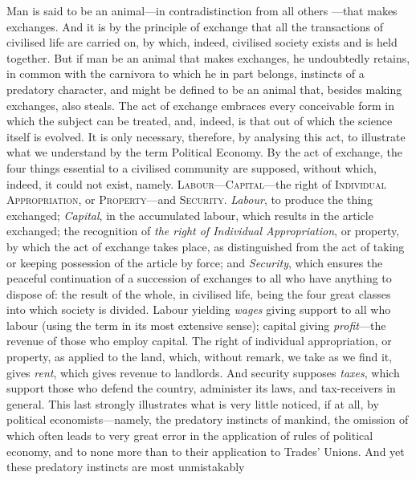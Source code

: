 \documentclass[12pt, a4paper]{book}
\begin{document}
    Man is said to be an animal---in contradistinction from all others
   ---that makes exchanges. And it is by the principle of exchange
    that all the transactions of civilised life are carried on, by
    which, indeed, civilised society exists and is held together. But if
    man be an animal that makes exchanges, he undoubtedly retains, in
    common with the carnivora to which he in part belongs, instincts of
    a predatory character, and might be defined to be an animal that,
    besides making exchanges, also steals. The act of exchange embraces
    every conceivable form in which the subject can be treated, and,
    indeed, is that out of which the science itself is evolved. It is
    only necessary, therefore, by analysing this act, to illustrate what
    we understand by the term Political Economy. By the act of exchange,
    the four things essential to a civilised community are supposed,
    without which, indeed, it could not exist, namely.
    \textsc{Labour}---\textsc{Capital}---the right of \textsc{Individual
    Appropriation}, or \textsc{Property}---and \textsc{Security}.
    \textit{Labour}, to produce the thing exchanged; \textit{Capital},
    in the accumulated labour, which results in the article exchanged;
    the recognition of \textit{the right of Individual Appropriation},
    or property, by which the act of exchange takes place, as
    distinguished from the act of taking or keeping possession of the
    article by force; and \textit{Security}, which ensures the peaceful
    continuation of a succession of exchanges to all who have anything
    to dispose of: the result of the whole, in civilised life, being the
    four great classes into which society is divided. Labour yielding
    \textit{wages} giving support to all who labour (using the term in
    its most extensive sense); capital giving \textit{profit}---the
    revenue of those who employ capital. The right of individual
    appropriation, or property, as applied to the land, which, without
    remark, we take as we find it, gives \textit{rent}, which gives
    revenue to landlords. And security supposes \textit{taxes}, which
    support those who defend the country, administer its laws, and
    tax-receivers in general. This last strongly illustrates what is
    very little noticed, if at all, by political economists---namely,
    the predatory instincts of mankind, the omission of which often
    leads to very great error in the application of rules of political
    economy, and to none more than to their application to Trades'
    Unions. And yet these predatory instincts are most unmistakably
\end{document}
